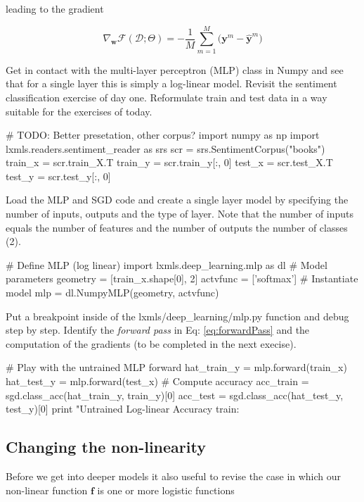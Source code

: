 \noindent leading to the gradient

\begin{equation}
\nabla_\mathbf{w}\mathcal{F}(\mathcal{D};\Theta) = -\frac{1}{M}\sum_{m=1}^M \Big(\mathbf{y}^m - \hat{\mathbf{y}}^m \Big)   
\label{eq:gradBias}
\end{equation}

\begin{exercise}
Get in contact with the multi-layer perceptron (MLP) class in Numpy and see that for a single layer this is simply a log-linear model. Revisit the sentiment classification exercise of day one. Reformulate train and test data in a way suitable for the exercises of today.  
\begin{python}
# TODO: Better presetation, other corpus?
import numpy as np
import lxmls.readers.sentiment_reader as srs  
scr     = srs.SentimentCorpus("books")
train_x = scr.train_X.T
train_y = scr.train_y[:, 0]
test_x  = scr.test_X.T
test_y  = scr.test_y[:, 0]
\end{python}
%
Load the MLP and SGD code and create a single layer model by specifying the number of inputs, outputs and the type of layer. Note that the number of inputs equals the number of features and the number of outputs the number of classes (2).
%
\begin{python}
# Define MLP (log linear)
import lxmls.deep_learning.mlp as dl
# Model parameters
geometry = [train_x.shape[0], 2]
actvfunc = ['softmax']
# Instantiate model
mlp      = dl.NumpyMLP(geometry, actvfunc)
\end{python}
Put a breakpoint inside of the lxmls/deep\_learning/mlp.py function and debug step by step. Identify the \textit{forward pass} in Eq: \ref{eq:forwardPass} and the computation of the gradients (to be completed in the next execise). 
\begin{python}
# Play with the untrained MLP forward
hat_train_y = mlp.forward(train_x) 
hat_test_y  = mlp.forward(test_x) 
# Compute accuracy
acc_train = sgd.class_acc(hat_train_y, train_y)[0]
acc_test  = sgd.class_acc(hat_test_y, test_y)[0]
print "Untrained Log-linear Accuracy train: %
\end{python}
\end{exercise}

\subsection{Changing the non-linearity}

Before we get into deeper models it also useful to revise the case in which our non-linear function $\mathbf{f}$ is one or more logistic functions

